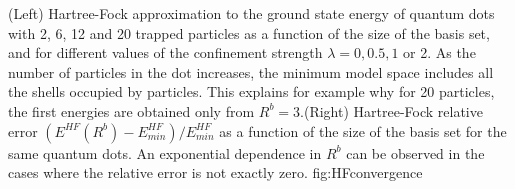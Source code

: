 
% 


{(Left) Hartree-Fock approximation to the ground state energy of quantum dots with 2, 6, 12 and 20 trapped particles as a function of the size of the basis set, and for different values of the confinement strength $\lambda=0, 0.5,1$ or 2. As the number of particles in the dot increases, the minimum model space includes all the shells occupied by particles. This explains for example why for 20 particles, the first energies are obtained only from $R^b=3$.\newline (Right) Hartree-Fock relative error $(E^{HF}(R^b)-E^{HF}_{min})/E^{HF}_{min}$ as a function of the size of the basis set for the same quantum dots. An exponential dependence in $R^b$ can be observed in the cases where the relative error is not exactly zero.}
{fig:HFconvergence}

